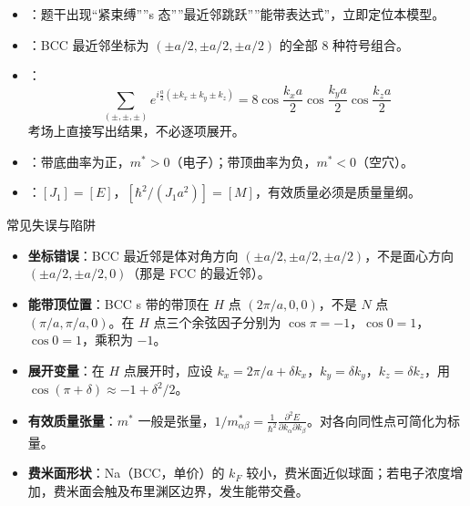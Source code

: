 \begin{tipbox}[快速识别与解题技巧]
\begin{itemize}
    \item {}：题干出现``紧束缚''''s 态''''最近邻跳跃''''能带表达式''，立即定位本模型。
    \item {}：BCC 最近邻坐标为 $(\pm a/2,\pm a/2,\pm a/2)$ 的全部 8 种符号组合。
    \item {}：
    \[
    \sum_{(\pm,\pm,\pm)}e^{i\frac{a}{2}(\pm k_x\pm k_y\pm k_z)}=8\cos\frac{k_xa}{2}\cos\frac{k_ya}{2}\cos\frac{k_za}{2}
    \]
    考场上直接写出结果，不必逐项展开。
    \item {}：带底曲率为正，$m^*>0$（电子）；带顶曲率为负，$m^*<0$（空穴）。
    \item {}：$[J_1]=[E]$，$[\hbar^2/(J_1a^2)]=[M]$，有效质量必须是质量量纲。
\end{itemize}
\end{tipbox}

\begin{errorbox}{常见失误与陷阱}
\begin{itemize}
    \item \textbf{坐标错误}：BCC 最近邻是体对角方向 $(\pm a/2,\pm a/2,\pm a/2)$，不是面心方向 $(\pm a/2,\pm a/2,0)$（那是 FCC 的最近邻）。
    \item \textbf{能带顶位置}：BCC s 带的带顶在 $H$ 点 $(2\pi/a,0,0)$，不是 $N$ 点 $(\pi/a,\pi/a,0)$。在 $H$ 点三个余弦因子分别为 $\cos\pi=-1$，$\cos0=1$，$\cos0=1$，乘积为 $-1$。
    \item \textbf{展开变量}：在 $H$ 点展开时，应设 $k_x=2\pi/a+\delta k_x$，$k_y=\delta k_y$，$k_z=\delta k_z$，用 $\cos(\pi+\delta)\approx-1+\delta^2/2$。
    \item \textbf{有效质量张量}：$m^*$ 一般是张量，$1/m^*_{\alpha\beta}=\frac{1}{\hbar^2}\frac{\partial^2E}{\partial k_\alpha\partial k_\beta}$。对各向同性点可简化为标量。
    \item \textbf{费米面形状}：Na（BCC，单价）的 $k_F$ 较小，费米面近似球面；若电子浓度增加，费米面会触及布里渊区边界，发生能带交叠。
\end{itemize}
\end{errorbox}

